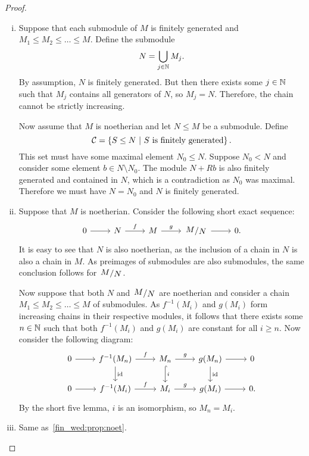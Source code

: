 \begin{proof}
\phantom{a}
\begin{enumerate}[i)]
\item Suppose that each submodule of $M$ is finitely generated and
$M_1 \leq M_2 \leq \dots \leq M$. Define the submodule
\[
N = \bigcup_{j \in \mathbb{N}} M_j.
\]
By assumption, $N$ is finitely generated. But then there exists
some $j \in \mathbb{N}$ such that $M_j$ contains all generators of $N$,
so $M_j = N$. Therefore, the chain cannot be strictly increasing.

Now assume that $M$ is noetherian and let $N \leq M$ be a
submodule. Define
\[
\mathcal{C} = \left\{S \leq N~\middle\vert~\text{$S$ is finitely generated}\right\}.
\]
This set must have some maximal element $N_0 \leq N$. Suppose
$N_0 < N$ and consider some element $b \in N \setminus N_0$. The
module $N + Rb$ is also finitely generated and contained in $N$,
which is a contradiction as $N_0$ was maximal. Therefore we must
have $N = N_0$ and $N$ is finitely generated.

\item Suppose that $M$ is noetherian. Consider the following short
exact sequence:
\[
\begin{tikzcd}
0 \arrow[r] & N \arrow[r, "f"] &
M \arrow[r, "g"] & \kvoc{M}{N} \arrow[r] & 0.
\end{tikzcd}
\]
It is easy to see that $N$ is also noetherian, as the inclusion of
a chain in $N$ is also a chain in $M$. As preimages of submodules
are also submodules, the same conclusion follows for $\kvoc{M}{N}$.

Now suppose that both $N$ and $\kvoc{M}{N}$ are noetherian and
consider a chain $M_1 \leq M_2 \leq \dots \leq M$ of submodules.
As $f^{-1}(M_i)$ and $g(M_i)$ form increasing chains in their
respective modules, it follows that there exists some $n \in \mathbb{N}$
such that both $f^{-1}(M_i)$ and $g(M_i)$ are constant for all
$i \geq n$. Now consider the following diagram:
\[
\begin{tikzcd}
0 \arrow[r] &
f^{-1}(M_n) \arrow[r, "f"] \arrow[d, "\id"] &
M_n \arrow[r, "g"] \arrow[d, hook, "i"] &
g(M_n) \arrow[r] \arrow[d, "\id"] &
0 \\
0 \arrow[r] &
f^{-1}(M_i) \arrow[r, "f"] &
M_i \arrow[r, "g"] &
g(M_i) \arrow[r] &
0.
\end{tikzcd}
\]
By the short five lemma, $i$ is an isomorphism, so $M_n = M_i$.
\item Same as~\ref{fin_wed:prop:noet}. \qedhere
\end{enumerate}
\end{proof}
